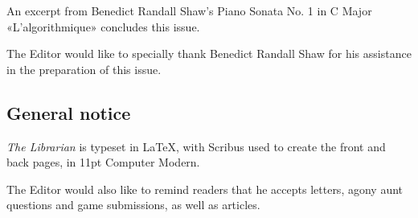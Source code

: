 An excerpt from Benedict Randall Shaw's Piano Sonata No. 1 in C Major «L'algorithmique» concludes this issue.

The Editor would like to specially thank Benedict Randall Shaw for his assistance in the preparation of this issue.

\subsection{General notice}

\textit{The Librarian} is typeset in \LaTeX, with Scribus used to create the front and back pages, in 11pt Computer Modern.

The Editor would also like to remind readers that he accepts letters, agony aunt questions and game submissions, as well as articles.
